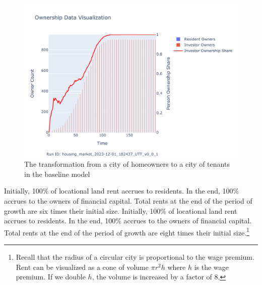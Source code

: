 \begin{figure}
    \centering
    \includegraphics[scale=.8, trim={0 1cm 0 1.8cm},clip]{fig/Analysis/Ownership_Data_1.pdf}
    \caption{The transformation from a city of homeowners to a city of tenants in the baseline model}
    \label{fig:Baseline_ownership_trajectory}
\end{figure}



Initially, 100\% of locational land rent accrues to residents. In the end, 100\% accrues to the owners of financial capital. Total rents at the end of the period of growth are six times their initial size. 
Initially, 100\% of locational land rent accrues to residents. In the end, 100\% accrues to the owners of financial capital. Total rents at the end of the period of growth are eight times their initial size.\footnote{Recall that the radius of a circular city is proportional to the wage premium. Rent can be visualized as a cone of volume $\pi r^2 h$ where $h$ is the wage premium. If we double $h$, the volume is increased by a factor of 8.}

 